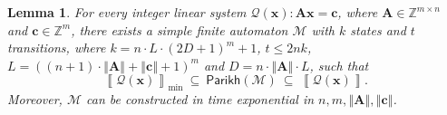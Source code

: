 \documentclass[10pt,a4paper]{article}
\newtheorem{lemma}[theorem]{Lemma}
\theoremstyle{definition}
\theoremstyle{remark}
\newcommand{\cM}{\mathcal{M}}
\newcommand{\cQ}{\mathcal{Q}}
\newcommand{\bbZ}{\mathbb{Z}}
\newcommand{\bfA}{\mathbf{A}}
\newcommand{\bfc}{\mathbf{c}}
\newcommand{\bfx}{\mathbf{x}}
\newcommand{\norm}[1]        {\left\Vert #1 \right\Vert}
\newcommand{\parikh}[1] {\mathsf{Parikh}\left( #1 \right)}
\newcommand{\sol}[1] {\left\llbracket #1 \right\rrbracket}
\newcommand{\solmin}[1] {\left\llbracket #1 \right\rrbracket_\text{min}}
\begin{document}
\begin{lemma}\label{lem:ilp_to_nfa}
For every integer linear system $\cQ(\bfx): \bfA \bfx = \bfc$,
where $\bfA \in \bbZ^{m \times n}$ and $\bfc \in \bbZ^{m}$,
there exists a simple finite automaton $\cM$
with $k$ states and $t$ transitions,
where $k = n\cdot L\cdot(2D+1)^{m} + 1$, 
$t \le 2nk$,
$L = \left((n+1)\cdot\norm{\bfA} + \norm{\bfc} + 1\right)^{m}$
and $D = n \cdot \norm{\bfA} \cdot L$,
    such that
    \begin{equation*}
        \solmin{\cQ(\bfx)}
        \ \subseteq\ 
        \parikh{\cM}
        \ \subseteq\ 
        \sol{\cQ(\bfx)}.
    \end{equation*}
    Moreover, $\cM$ can be constructed in time exponential in $n,m,\norm{\bfA},\norm{\bfc}$.
\end{lemma}
\end{document}

